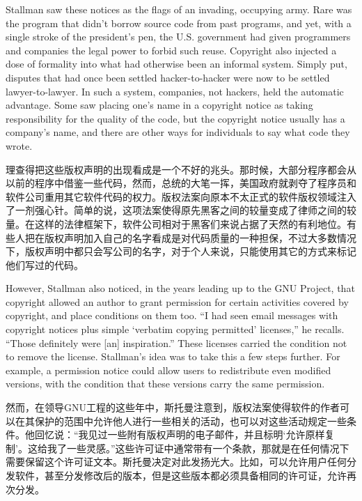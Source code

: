 \ifdefined\eng
Stallman saw these notices as the flags of an invading, occupying army. Rare was the program that didn't borrow source code from past programs, and yet, with a single stroke of the president's pen, the U.S. government had given programmers and companies the legal power to forbid such reuse.  Copyright also injected a dose of formality into what had otherwise been an informal system. Simply put, disputes that had once been settled hacker-to-hacker were now to be settled lawyer-to-lawyer. In such a system, companies, not hackers, held the automatic advantage.  Some saw placing one's name in a copyright notice as taking responsibility for the quality of the code, but the copyright notice usually has a company's name, and there are other ways for individuals to say what code they wrote.
\fi

\ifdefined\chs
理查得把这些版权声明的出现看成是一个不好的兆头。那时候，大部分程序都会从以前的程序中借鉴一些代码，然而，总统的大笔一挥，美国政府就剥夺了程序员和软件公司重用其它软件代码的权力。版权法案向原本不太正式的软件版权领域注入了一剂强心针。简单的说，这项法案使得原先黑客之间的较量变成了律师之间的较量。在这样的法律框架下，软件公司相对于黑客们来说占据了天然的有利地位。有些人把在版权声明加入自己的名字看成是对代码质量的一种担保，不过大多数情况下，版权声明中都只会写公司的名字，对于个人来说，只能使用其它的方式来标记他们写过的代码。
\fi

\ifdefined\eng
However, Stallman also noticed, in the years leading up to the GNU Project, that copyright allowed an author to grant permission for certain activities covered by copyright, and place conditions on them too.  ``I had seen email messages with copyright notices plus simple `verbatim copying permitted' licenses,'' he recalls. ``Those definitely were [an] inspiration.''  These licenses carried the condition not to remove the license.  Stallman's idea was to take this a few steps further.  For example, a permission notice could allow users to redistribute even modified versions, with the condition that these versions carry the same permission.
\fi

\ifdefined\chs
然而，在领导GNU工程的这些年中，斯托曼注意到，版权法案使得软件的作者可以在其保护的范围中允许他人进行一些相关的活动，也可以对这些活动规定一些条件。他回忆说：“我见过一些附有版权声明的电子邮件，并且标明‘允许原样复制’。这给我了一些灵感。”这些许可证中通常带有一个条款，那就是在任何情况下需要保留这个许可证文本。斯托曼决定对此发扬光大。比如，可以允许用户任何分发软件，甚至分发修改后的版本，但是这些版本都必须具备相同的许可证，允许再次分发。
\fi


